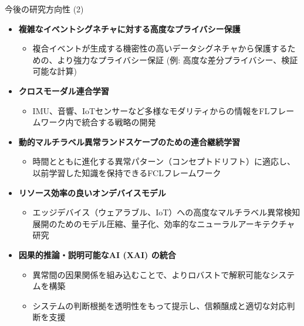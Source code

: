 \documentclass[unicode,12pt,aspectratio=169,dvipdfmx]{beamer}
\begin{document}
\begin{frame}{今後の研究方向性 (2)}
\begin{itemize}
    \item \textbf{複雑なイベントシグネチャに対する高度なプライバシー保護}
    \begin{itemize}
        \item 複合イベントが生成する機密性の高いデータシグネチャから保護するための、より強力なプライバシー保証 (例: 高度な差分プライバシー、検証可能な計算)
    \end{itemize}
    \item \textbf{クロスモーダル連合学習}
    \begin{itemize}
        \item IMU、音響、IoTセンサーなど多様なモダリティからの情報をFLフレームワーク内で統合する戦略の開発
    \end{itemize}
    \item \textbf{動的マルチラベル異常ランドスケープのための連合継続学習}
    \begin{itemize}
        \item 時間とともに進化する異常パターン（コンセプトドリフト）に適応し、以前学習した知識を保持できるFCLフレームワーク
    \end{itemize}
    \item \textbf{リソース効率の良いオンデバイスモデル}
    \begin{itemize}
        \item エッジデバイス（ウェアラブル、IoT）への高度なマルチラベル異常検知展開のためのモデル圧縮、量子化、効率的なニューラルアーキテクチャ研究
    \end{itemize}
    \item \textbf{因果的推論・説明可能なAI (XAI) の統合}
    \begin{itemize}
        \item 異常間の因果関係を組み込むことで、よりロバストで解釈可能なシステムを構築
        \item システムの判断根拠を透明性をもって提示し、信頼醸成と適切な対応判断を支援
    \end{itemize}
\end{itemize}
\end{frame}

\end{document}
